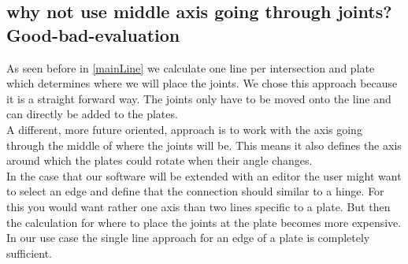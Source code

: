 \documentclass[../ClassicThesis.tex]{subfiles}
\begin{document}

\subsection{why not use middle axis going through joints? Good-bad-evaluation}
As seen before in \ref{mainLine} we calculate one line per intersection and plate which determines where we will place the joints. We chose this approach because it is a straight forward way. The joints only have to be moved onto the line and can directly be added to the plates. \\
A different, more future oriented, approach is to work with the axis going through the middle of where the joints will be. This means it also defines the axis around which the plates could rotate when their angle changes. \\
In the case that our software will be extended with an editor the user might want to select an edge and define that the connection should similar to a hinge. For this you would want rather one axis than two lines specific to a plate. But then the calculation for where to place the joints at the plate becomes more expensive.\\
In our use case the single line approach for an edge of a plate is completely sufficient.
\end{document}
